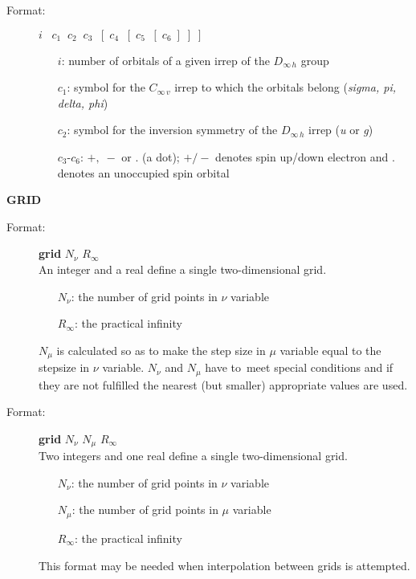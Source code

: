 \documentclass[12pt,a4paper]{article}
\begin{document}
\begin{description}
\begin{description} 
\item[Format:] $i\;\;\;c_1\;\;c_2\;\;c_3\;\;[\;c_4\;\;[\;c_5\;\;[\;c_6\;]\;]\;]$
\begin{itemize} 
\item[$i$:]  number of orbitals of a given irrep of the
$D_{\infty\,h}$ group
\item[$c_1$:] symbol for the $C_{\infty\,v}$ irrep to which the
orbitals belong ({\it sigma, pi, delta, phi}) 
\item[$c_2$:] symbol for the inversion symmetry of the $D_{\infty\,h}$
irrep ({\it u} or {\it g}) 
\item[$c_3$-$c_6$:] $+,\;-$ or . (a dot); $+/-$ denotes spin up/down
electron and . denotes an unoccupied spin orbital
\end{itemize} 
\end{description} 


\item \textbf{GRID} 

\begin{description} 
\item[Format:] \textbf{grid} $N_{\nu}$ $R_{\infty}$ \\
An integer and a real define a single two-dimensional grid.
\begin{itemize} 
\item[$N_{\nu}$:] the number of grid points in $\nu$ variable
\item[$R_{\infty}$:] the practical infinity 
\end{itemize}
$N_{\mu}$ is calculated so as to make the step size in $\mu$ variable equal to the
stepsize in $\nu$ variable. $N_{\nu}$ and $N_{\mu}$ have to~meet special conditions and if
they are not fulfilled the nearest (but smaller) appropriate values are used.
\end{description} 

\begin{description} 
\item[Format:] \textbf{grid} $N_{\nu}$ $N_{\mu}$ $R_{\infty}$ \\
Two integers and one real define a single two-dimensional grid.
\begin{itemize} 
\item[$N_{\nu}$:] the number of grid points in $\nu$ variable
\item[$N_{\mu}$:] the number of grid points in $\mu$ variable
\item[$R_{\infty}$:] the practical infinity 
\end{itemize}
This format may be needed when interpolation between grids is attempted.
\end{description} 




\end{description}
\end{document}
